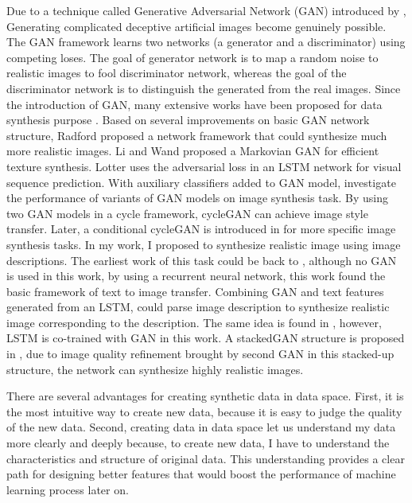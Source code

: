 \documentclass{iitthesis}
\begin{document}
Due to a technique called Generative Adversarial Network (GAN) introduced by \cite{goodfellow2014generative}, Generating complicated deceptive artificial images become genuinely possible. The GAN framework learns two networks (a generator and a discriminator) using competing loses. The goal of generator network is to map a random noise to realistic images to fool discriminator network, whereas the goal of the discriminator network is to distinguish the generated from the real images. Since the introduction of GAN, many extensive works have been proposed for data synthesis purpose \cite{salimans2016improved}. Based on several improvements on basic GAN network structure, Radford \cite{radford2015unsupervised} proposed a network framework that could synthesize much more realistic images. Li and Wand \cite{johnson2016perceptual} proposed a Markovian GAN for efficient texture synthesis. Lotter uses the adversarial loss in an LSTM network for visual sequence prediction. With auxiliary classifiers added to GAN model, \cite{odena2016conditional} investigate the performance of variants of GAN models on image synthesis task. By using two GAN models in a cycle framework, cycleGAN \cite{zhu2017unpaired} can achieve image style transfer. Later, a conditional cycleGAN is introduced in \cite{lu2017conditional} for more specific image synthesis tasks. In my work, I proposed to synthesize realistic image using image descriptions. The earliest work of this task could be back to \cite{mansimov2015generating}, although no GAN is used in this work, by using a recurrent neural network, this work found the basic framework of text to image transfer. Combining GAN and text features generated from an LSTM, \cite{reed2016generative} could parse image description to synthesize realistic image corresponding to the description. The same idea is found in \cite{DBLP:journals/corr/DongZMG17}, however, LSTM is co-trained with GAN in this work. A stackedGAN structure is proposed in \cite{zhang2016stackgan}, due to image quality refinement brought by second GAN in this stacked-up structure, the network can synthesize highly realistic images.


 \label{dataspace: solution}

There are several advantages for creating synthetic data in data space. First, it is the most intuitive way to create new data, because it is easy to judge the quality of the new data. Second, creating data in data space let us understand my data more clearly and deeply because, to create new data, I have to understand the characteristics and structure of original data. This understanding provides a clear path for designing better features that would boost the performance of machine learning process later on. 
\end{document}
